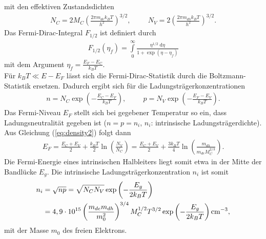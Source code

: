 \documentclass[a4paper,12pt]{article}
\begin{document}
mit den effektiven Zustandsdichten
\begin{align}
N_C=2M_C\left(\frac{2\pi m_{de}k_B T}{h^2}\right)^{3/2},\hspace{1cm}N_V=2\left(\frac{2\pi m_{dh}k_B T}{h^2}\right)^{3/2}.
\end{align}
Das Fermi-Dirac-Integral $F_{1/2}$ ist definiert durch
\begin{align}
F_{1/2}(\eta_f)=\int\limits_0^\infty \frac{\eta^{1/2}\;\mathrm{d}\eta}{1+\exp(\eta-\eta_f)}
\end{align}
mit dem Argument $\eta_f=\frac{E_F-E_C}{k_B T}$.\\
Für $k_B T\ll E-E_F$ lässt sich die Fermi-Dirac-Statistik durch die Boltzmann-Statistik ersetzen. Dadurch ergibt sich für die Ladungsträgerkonzentrationen
\begin{align}
n=N_C\exp\left(-\frac{E_C-E_F}{k_B T}\right),\hspace{1cm} p=N_V\exp\left(-\frac{E_F-E_V}{k_B T}\right).
\label{eq:density2}
\end{align}
Das Fermi-Niveau $E_F$ stellt sich bei gegebener Temperatur so ein, dass Ladungsneutralität gegeben ist ($n=p=n_i$, $n_i$: intrinsische Ladungsträgerdichte).\\
Aus Gleichung (\ref{eq:density2}) folgt dann
\begin{align}
E_F=\frac{E_C+E_V}{2}+\frac{k_B T}{2}\ln\left(\frac{N_V}{N_C}\right)=\frac{E_C+E_V}{2}+\frac{3 k_B T}{4}\ln\left(\frac{m_{dh}}{m_{de}M_C^{2/3}}\right).
\end{align}
Die Fermi-Energie eines intrinsischen Halbleiters liegt somit etwa in der Mitte der Bandlücke $E_g$. Die intrinsische Ladungsträgerkonzentration $n_i$ ist somit
\begin{align}
n_i&=\sqrt{np}=\sqrt{N_C N_V}\exp\left(-\frac{E_g}{2k_B T}\right)\notag\\
&=4,9\cdot 10^{15}\left(\frac{m_{de}m_{dh}}{m_0^2}\right)^{3/4}M_C^{1/2}T^{3/2}\exp\left(-\frac{E_g}{2k_B T}\right)\mathrm{cm}^{-3},
\end{align} 
mit der Masse $m_0$ des freien Elektrons.
\end{document}
